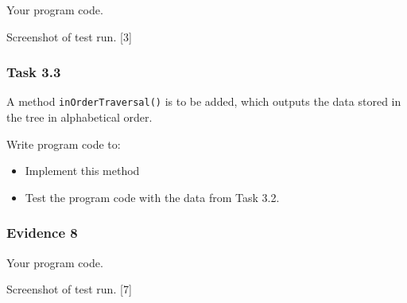 Your program code. 

Screenshot of test run.\hfill{} {[}3{]}

\subsubsection*{Task 3.3}

A method \texttt{inOrderTraversal()} is to be added, which outputs
the data stored in the tree in alphabetical order. 

Write program code to: 
\begin{itemize}
\item Implement this method 
\item Test the program code with the data from Task 3.2. 
\end{itemize}

\subsubsection*{Evidence 8}

Your program code. 

Screenshot of test run. \hfill{}{[}7{]}